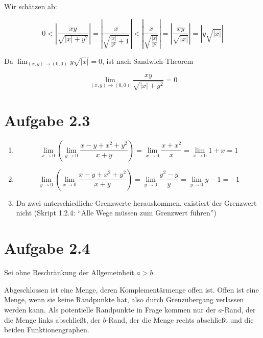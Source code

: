 \documentclass[a4paper,german,12pt,smallheadings]{scrartcl}
\begin{document}
Wir schätzen ab:

\begin{equation*}
  0 <
  \left| \frac{xy}{\sqrt{|x| + y^2}}          \right| =
  \left| \frac{x}{\sqrt{\frac{|x|}{y^2} + 1}} \right| <
  \left| \frac{x}{\sqrt{\frac{|x|}{y^2}}}     \right| =
  \left| \frac{xy}{\sqrt{|x|}}                \right| =
  \left| y\sqrt{|x|}                          \right|
\end{equation*}

Da $\lim_{(x,y) \to (0,0)} y\sqrt{|x|} = 0$, ist nach Sandwich-Theorem

\begin{equation*}
  \lim_{(x,y) \to (0,0)} \frac{xy}{\sqrt{|x| + y^2}} = 0
\end{equation*}

\section*{Aufgabe 2.3}

\begin{enumerate}[(1)]
  \item
    \begin{equation*}
      \lim_{x \to 0} \left( \lim_{y \to 0} \frac{x-y+x^2+y^2}{x+y} \right) =
      \lim_{x \to 0} \frac{x+x^2}{x}  =
      \lim_{x \to 0} 1+x =
      1
    \end{equation*}
  \item
    \begin{equation*}
      \lim_{y \to 0} \left( \lim_{x \to 0} \frac{x-y+x^2+y^2}{x+y} \right) =
      \lim_{y \to 0} \frac{y^2-y}{y} =
      \lim_{y \to 0} y-1 =
      -1
    \end{equation*}
  \item
    Da zwei unterschiedliche Grenzwerte herauskommen, existiert der Grenzwert
    nicht (Skript 1.2.4: ``Alle Wege müssen zum Grenzwert führen'')
\end{enumerate}

\section*{Aufgabe 2.4}

Sei ohne Beschränkung der Allgemeinheit $a > b$.

Abgeschlossen ist eine Menge, deren Komplementärmenge offen ist. Offen ist eine
Menge, wenn sie keine Randpunkte hat, also durch Grenzübergang verlassen werden
kann. Als potentielle Randpunkte in Frage kommen nur der $a$-Rand, der die
Menge links abschließt, der $b$-Rand, der die Menge rechts abschließt und die
beiden Funktionengraphen.
\end{document}
